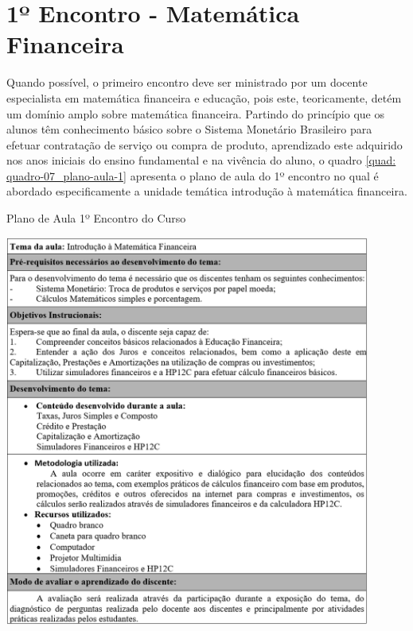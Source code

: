 \section{1º Encontro - Matemática Financeira}
Quando possível, o primeiro encontro deve ser ministrado por um docente especialista em matemática financeira e educação, pois este, teoricamente, detém um domínio amplo sobre matemática financeira. Partindo do princípio que os alunos têm conhecimento básico sobre o Sistema Monetário Brasileiro para efetuar contratação de serviço ou compra de produto, aprendizado este adquirido nos anos iniciais do ensino fundamental e na vivência do aluno, o quadro \ref{quad: quadro-07_plano-aula-1} apresenta o plano de aula do 1º encontro no qual é abordado especificamente a unidade temática introdução à matemática financeira.

\newpage

\graphicspath{{quadros/}}
\begin{quadro}[!ht]
\centering
\begin{minipage}{1.\textwidth}
\caption{Plano de Aula 1º Encontro do Curso}
\centering
\includegraphics[width=0.9\textwidth]{quadro-07_plano-aula-1.png}
\label{quad: quadro-07_plano-aula-1}
\end{minipage}
\end{quadro}

